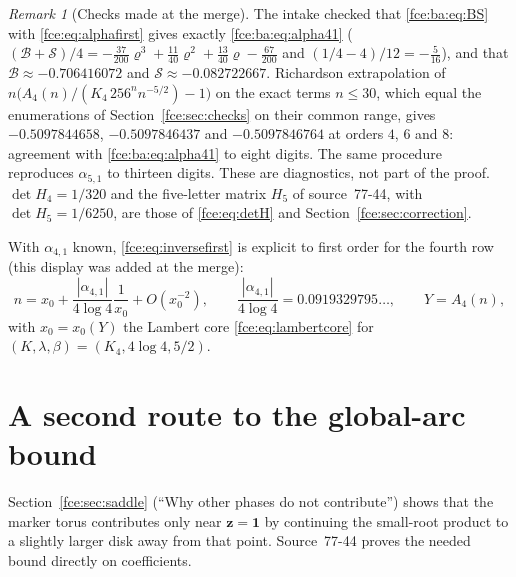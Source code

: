 \documentclass[11pt,a4paper]{article}
\numberwithin{equation}{section}
\theoremstyle{definition}\newtheorem{definition}[theorem]{Definition}
\theoremstyle{remark}\newtheorem{remark}[theorem]{Remark}
\newcommand{\one}{\boldsymbol 1}
\begin{document}
\begin{remark}[Checks made at the merge]\label{fce:ba:rem:checks}
The intake checked that \eqref{fce:ba:eq:BS} with \eqref{fce:eq:alphafirst}
gives exactly \eqref{fce:ba:eq:alpha41} ($(\mathcal B+\mathcal
S)/4=-\frac{37}{200}\varrho^3+\frac{11}{40}\varrho^2+\frac{13}{40}\varrho-\frac{67}{200}$
and $(1/4-4)/12=-\frac5{16}$), and that $\mathcal B\approx-0.706416072$ and
$\mathcal S\approx-0.082722667$. Richardson extrapolation of
$n\bigl(A_4(n)/(K_4\,256^nn^{-5/2})-1\bigr)$ on the exact terms $n\le30$, which equal
the enumerations of Section~\ref{fce:sec:checks} on their common range,
gives $-0.5097844658$, $-0.5097846437$ and $-0.5097846764$ at orders $4$, $6$
and $8$: agreement with \eqref{fce:ba:eq:alpha41} to eight digits. The
same procedure reproduces $\alpha_{5,1}$ to thirteen digits. These are
diagnostics, not part of the proof. $\det H_4=1/320$ and the five-letter
matrix $H_5$ of source~77-44, with $\det H_5=1/6250$, are those of
\eqref{fce:eq:detH} and Section~\ref{fce:sec:correction}.
\end{remark}

With $\alpha_{4,1}$ known, \eqref{fce:eq:inversefirst} is explicit to first
order for the fourth row (this display was added at the merge):
\begin{equation}\label{fce:ba:eq:inversefour}
 n=x_0+\frac{|\alpha_{4,1}|}{4\log4}\frac1{x_0}+O(x_0^{-2}),\qquad
 \frac{|\alpha_{4,1}|}{4\log4}=0.0919329795\ldots,\qquad Y=A_4(n),
\end{equation}
with $x_0=x_0(Y)$ the Lambert core \eqref{fce:eq:lambertcore} for
$(K,\lambda,\beta)=(K_4,4\log4,5/2)$.

\section{A second route to the global-arc bound}\label{fce:ba:sec:global}
Section~\ref{fce:sec:saddle} (``Why other phases do not contribute'') shows
that the marker torus contributes only near $\boldsymbol z=\one$ by
continuing the small-root product to a slightly larger disk away from that
point. Source~77-44 proves the needed bound directly on coefficients.
\end{document}
